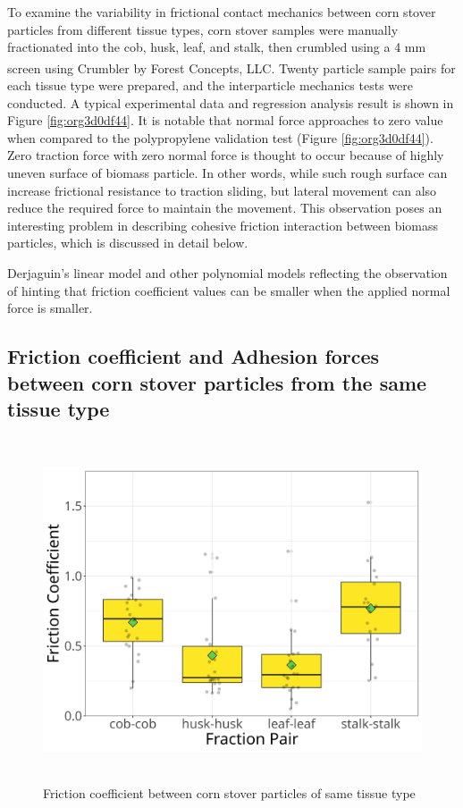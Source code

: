 \documentclass[xcolor=dvipsnames,10pt,hidelinks]{article}
\let\oldsubsection\subsection
\renewcommand{\subsection}{\clearpage\oldsubsection}
\begin{document}
\begin{itemize}
To examine the variability in frictional contact mechanics between corn stover particles from different tissue types, corn stover samples were manually fractionated into the cob, husk, leaf, and stalk, then crumbled using a 4 mm screen using Crumbler\textsuperscript{\textregistered} by Forest Concepts, LLC. Twenty particle sample pairs for each tissue type were prepared, and the interparticle mechanics tests were conducted. A typical experimental data and regression analysis result is shown in Figure \ref{fig:org3d0df44}.
It is notable that normal force approaches to zero value when compared to the polypropylene validation test (Figure \ref{fig:org3d0df44}).
Zero traction force with zero normal force is thought to occur because of highly uneven surface of biomass particle.
In other words, while such rough surface can increase frictional resistance to traction sliding, but
lateral movement can also reduce the required force to maintain the movement.
This observation poses an interesting problem in describing cohesive friction interaction between biomass particles, which is discussed in detail below.

Derjaguin’s linear model and other polynomial models reflecting the observation of \textcite{sedlak_effect_2017} hinting that friction coefficient values can be smaller when the applied normal force is smaller.
\newpage
\end{itemize}
\subsection{Friction coefficient and Adhesion forces between corn stover particles from the same tissue type}
\label{sec:org82c0a2d}
\begin{figure}[htbp]
\centering
\includegraphics[height=4in]{./figures/cs_cs_same_fraction_coeff_mu_box_plt.png}
\caption{\label{fig:org3a1c5d4}Friction coefficient between corn stover particles of same tissue type}
\end{figure}
\end{document}
